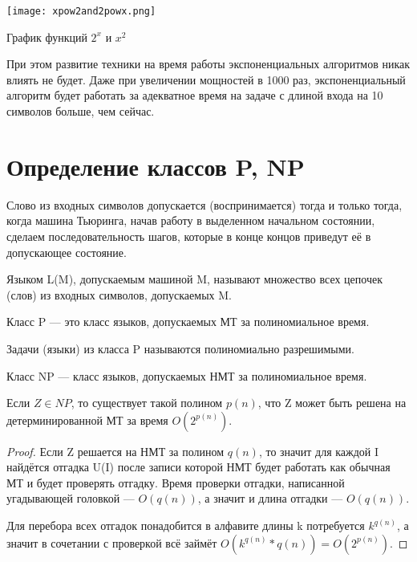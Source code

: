 \begin{marginfigure}[-5.5cm]
	\texttt{[image: xpow2and2powx.png]}
	\caption{График функций $2^x$ и $x^2$ }
\end{marginfigure}

При этом развитие техники на время работы экспоненциальных алгоритмов никак
влиять не будет. Даже при увеличении мощностей в 1000 раз, экспоненциальный
алгоритм будет работать за адекватное время на задаче с длиной входа на 10
символов больше, чем сейчас.


\section{Определение классов P, NP}

\begin{definition}
	Слово из входных символов допускается (воспринимается) тогда и только
	тогда, когда машина Тьюринга, начав работу в выделенном начальном
	состоянии, сделаем последовательность шагов, которые в конце концов
	приведут её в допускающее состояние.
\end{definition}
\begin{definition}
	Языком L(M), допускаемым машиной M, называют множество всех цепочек
	(слов) из входных символов, допускаемых M.
\end{definition}

\begin{definition}
	Класс P --- это класс языков, допускаемых МТ за полиномиальное
	время. 
\end{definition}
Задачи (языки) из класса P называются полиномиально разрешимыми.
\begin{definition}
	Класс NP --- класс языков, допускаемых НМТ за полиномиальное время.
\end{definition}

\begin{theorem}
	Если $Z\in NP$, то существует такой полином  $p(n)$, что Z может быть
	решена на детерминированной МТ за время  $O(2^{p(n)})$.
\end{theorem}
\begin{proof}
Если Z решается на НМТ за полином $q\left( n \right) $, то значит для каждой I
найдётся отгадка U(I) после записи которой НМТ будет работать как обычная МТ и
будет проверять отгадку. Время проверки отгадки, написанной
угадывающей головкой --- $O(q(n))$, а значит и длина отгадки --- $O(q(n))$. 

Для перебора всех отгадок понадобится в алфавите длины k потребуется $k^{q(n)}$,
а значит в сочетании с
проверкой всё займёт $O(k^{q(n)}*q(n)) = O(2^{p(n)})$.
\end{proof}

